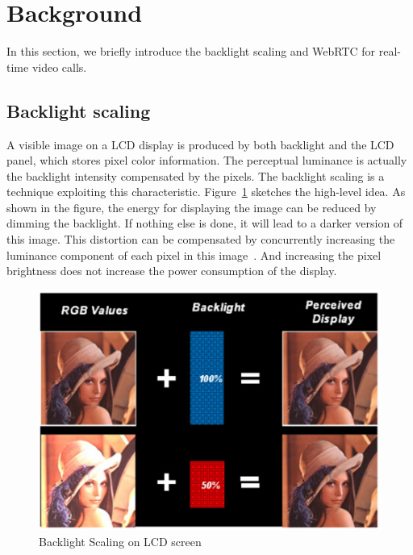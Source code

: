 \section{Background}
\label{sec:background}
In this section, we briefly introduce the backlight scaling and WebRTC
for real-time video calls.

\subsection{Backlight scaling}
A visible image on a LCD display is produced by both backlight and the
LCD panel, which stores pixel color information. The perceptual
luminance is actually the backlight intensity compensated by the
pixels. The backlight scaling is a technique  exploiting this
characteristic.  Figure~\ref{fig:backlightscaling} sketches the
high-level idea. As shown in the figure, the energy for displaying the
image can be reduced by dimming the backlight. If nothing else is
done, it will lead to a darker version of this image. This distortion
can be compensated by concurrently increasing the luminance component
of each pixel in this image~\cite{PMLDV03, CHP07, CCS06, CSC02}. And
increasing the pixel brightness does not increase the power
consumption of the display.


\begin{figure}[!htb]
  \centering
  \includegraphics[width=.45\textwidth]{./figures/backlightscaling.eps}
  \caption{Backlight Scaling on LCD screen}
  \label{fig:backlightscaling}
\end{figure}

